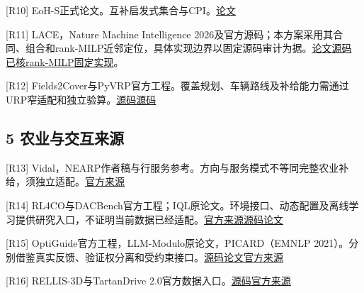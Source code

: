 \documentclass[11pt,a4paper]{article}
\newcommand{\bodytext}[1]{#1\par}
\begin{document}
\bodytext{[R10] EoH-S正式论文。互补启发式集合与CPI。\newline \href{https://ojs.aaai.org/index.php/AAAI/article/download/41038/44999}{论文}}
\bodytext{[R11] LACE，Nature Machine Intelligence 2026及官方源码；本方案采用其合同、组合和rank-MILP近邻定位，具体实现边界以固定源码审计为据。\newline \href{https://www.nature.com/articles/s42256-026-01307-8}{论文}\newline \href{https://github.com/PJ-NTU/LACE}{源码} \href{https://github.com/PJ-NTU/LACE/blob/d772b74690075f641be8077e69748ec482e9febf/lace/evolution/milp\_selection.py}{已核rank-MILP固定实现}。}
\bodytext{[R12] Fields2Cover与PyVRP官方工程。覆盖规划、车辆路线及补给能力需通过URP窄适配和独立验算。\newline \href{https://github.com/Fields2Cover/Fields2Cover}{源码}\newline \href{https://github.com/PyVRP/PyVRP}{源码}}
\subsection{5  农业与交互来源}
\bodytext{[R13] Vidal，NEARP作者稿与行服务参考。方向与服务模式不等同完整农业补给，须独立适配。\newline \href{https://w1.cirrelt.ca/~vidalt/papers/NEARP-Vidal-Revision-WP.pdf}{官方来源}}
\bodytext{[R14] RL4CO与DACBench官方工程；IQL原论文。环境接口、动态配置及离线学习提供研究入口，不证明当前数据已经适配。\newline \href{https://rl4co.ai4co.org/docs/content/api/envs/base/}{官方来源}\newline \href{https://github.com/automl/DACBench}{源码}\newline \href{https://arxiv.org/abs/2110.06169}{论文}}
\bodytext{[R15] OptiGuide官方工程，LLM-Modulo原论文，PICARD（EMNLP 2021）。分别借鉴真实反馈、验证权分离和受约束接口。\newline \href{https://github.com/microsoft/OptiGuide/tree/main/what-if}{源码}\newline \href{https://arxiv.org/html/2402.01817v3}{论文}\newline \href{https://aclanthology.org/2021.emnlp-main.779/}{官方来源}}
\bodytext{[R16] RELLIS-3D与TartanDrive 2.0官方数据入口。\newline \href{https://github.com/unmannedlab/RELLIS-3D}{源码}\newline \href{https://theairlab.org/TartanDrive2/}{官方来源}}
\end{document}

